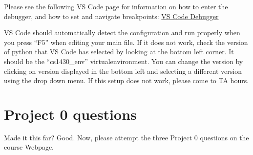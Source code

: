 \documentclass{article}
\begin{document}
Please see the following VS Code page for information on how to enter the debugger, and how to set and navigate breakpoints:
\href{https://code.visualstudio.com/docs/editor/debugging}{VS Code Debugger}

VS Code should automatically detect the configuration and run properly when you press ``F5'' when editing your main file. If it does not work, check the version of python that VS Code has selected by looking at the bottom left corner. It should be the ``cs1430\_env'' virtualenvironment. You can change the version by clicking on version displayed in the bottom left and selecting a different version using the drop down menu. If this setup does not work, please come to TA hours.

\section{Project 0 questions}
Made it this far? Good. Now, please attempt the three Project 0 questions on the course Webpage.
\end{document}
